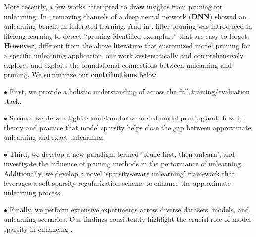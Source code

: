 More recently, 
a few  works   \cite{wang2022federated,ye2022learning} attempted to draw insights from pruning for unlearning. In \citet{wang2022federated},  removing channels of a  deep neural network (\textbf{DNN}) showed an  unlearning benefit in federated learning. And in \citet{ye2022learning}, filter pruning   was introduced in lifelong learning to detect ``pruning identified exemplars'' \cite{hooker2019compressed} that  are easy to forget.
\textbf{However}, different from the above literature that    customized  model pruning   for a specific unlearning application,  our work systematically and comprehensively explores and exploits the foundational connections between unlearning and pruning.
We summarize our \textbf{contributions} below.


$\bullet$ First, we provide  a holistic understanding of  {\MU} across the full training/evaluation stack. 


$\bullet$ Second, we draw a tight connection between {\MU} and model pruning and show in   theory and practice that model sparsity   helps  close the gap between approximate unlearning and exact unlearning.


$\bullet$ Third, we develop a new {\MU} paradigm termed `prune first, then unlearn', and investigate the influence of pruning methods in the performance of unlearning. Additionally, we   develop a novel `sparsity-aware unlearning' framework that leverages a soft sparsity regularization scheme to enhance the approximate unlearning process.


$\bullet$ Finally, we perform extensive experiments across diverse datasets, models, and unlearning scenarios. Our findings consistently highlight the crucial role of model sparsity in enhancing \MU.

